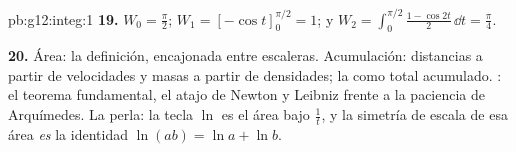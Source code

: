 \begin{solution}{pb:g12:integ:1}
\textbf{19.} $W_0 = \frac\pi2$; $W_1 = \left[-\cos t\right]_0^{\pi/2} = 1$;
y $W_2 = \int_0^{\pi/2} \frac{1 - \cos 2t}{2}\,\dd t = \frac\pi4$.

\textbf{20.} Área: la definición, encajonada entre escaleras. Acumulación:
distancias a partir de velocidades y masas a partir de densidades; la
 como total acumulado. : el teorema fundamental, el atajo
de Newton y Leibniz frente a la paciencia de Arquímedes. La perla: la tecla
$\ln$ es el área bajo $\frac1t$, y la simetría de escala de esa área
\emph{es} la identidad $\ln(ab) = \ln a + \ln b$.
\end{solution}
